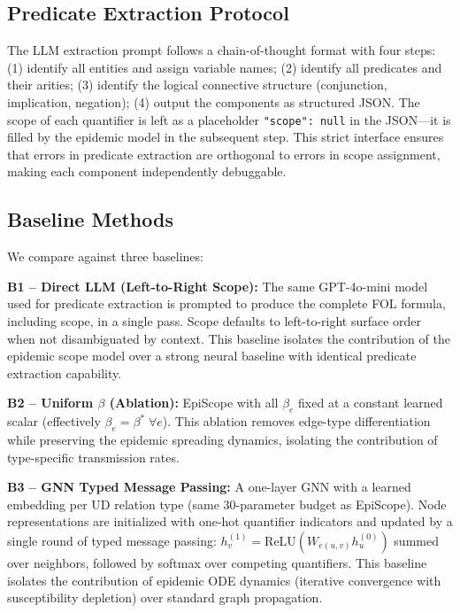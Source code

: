 \documentclass[11pt,letterpaper]{article}
\begin{document}
\subsection{Predicate Extraction Protocol}

The LLM extraction prompt follows a chain-of-thought format with four steps: (1) identify all entities and
assign variable names; (2) identify all predicates and their arities; (3) identify the logical connective
structure (conjunction, implication, negation); (4) output the components as structured JSON. The scope of each
quantifier is left as a placeholder \texttt{"scope": null} in the JSON---it is filled by the epidemic model in
the subsequent step. This strict interface ensures that errors in predicate extraction are orthogonal to errors
in scope assignment, making each component independently debuggable.

\subsection{Baseline Methods}

We compare against three baselines:

\textbf{B1 -- Direct LLM (Left-to-Right Scope):} The same GPT-4o-mini model used for predicate extraction is
prompted to produce the complete FOL formula, including scope, in a single pass. Scope defaults to
left-to-right surface order when not disambiguated by context. This baseline isolates the contribution of the
epidemic scope model over a strong neural baseline with identical predicate extraction capability.

\textbf{B2 -- Uniform $\beta$ (Ablation):} EpiScope with all $\beta_e$ fixed at a constant learned scalar
(effectively $\beta_e = \beta^* \; \forall e$). This ablation removes edge-type differentiation while
preserving the epidemic spreading dynamics, isolating the contribution of type-specific transmission rates.

\textbf{B3 -- GNN Typed Message Passing:} A one-layer GNN with a learned embedding per UD relation type (same
30-parameter budget as EpiScope). Node representations are initialized with one-hot quantifier indicators and
updated by a single round of typed message passing: $h_v^{(1)} = \text{ReLU}\left(W_{e(u,v)} h_u^{(0)}\right)$
summed over neighbors, followed by softmax over competing quantifiers. This baseline isolates the contribution
of epidemic ODE dynamics (iterative convergence with susceptibility depletion) over standard graph propagation.
\end{document}
